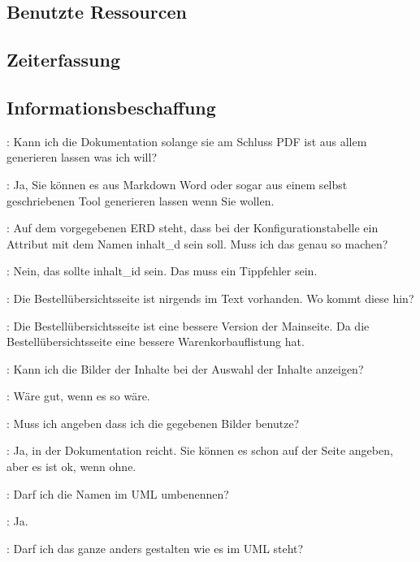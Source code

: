 \documentclass[a4paper, 11pt]{article}
\begin{document}
\subsection{Benutzte Ressourcen}

\subsection{Zeiterfassung}

\subsection{Informationsbeschaffung}

\begin{drama}

\msspeaks: Kann ich die Dokumentation solange sie am Schluss PDF ist aus allem generieren lassen was ich will?

\dozentspeaks: Ja, Sie können es aus Markdown Word oder sogar aus einem selbst geschriebenen Tool generieren lassen wenn Sie wollen.

\msspeaks: Auf dem vorgegebenen ERD steht, dass bei der Konfigurationstabelle ein Attribut mit dem Namen inhalt\_d sein soll. Muss ich das genau so machen?

\dozentspeaks: Nein, das sollte inhalt\_id sein. Das muss ein Tippfehler sein.

\msspeaks: Die Bestellübersichtsseite ist nirgends im Text vorhanden. Wo kommt diese hin?

\dozentspeaks: Die Bestellübersichtsseite ist eine bessere Version der Mainseite. Da die Bestellübersichtsseite eine bessere Warenkorbauflistung hat.

\msspeaks: Kann ich die Bilder der Inhalte bei der Auswahl der Inhalte anzeigen?

\dozentspeaks: Wäre gut, wenn es so wäre.

\msspeaks: Muss ich angeben dass ich die gegebenen Bilder benutze?

\dozentspeaks: Ja, in der Dokumentation reicht. Sie können es schon auf der Seite angeben, aber es ist ok, wenn ohne.

\msspeaks: Darf ich die Namen im UML umbenennen?

\dozentspeaks: Ja.

\msspeaks: Darf ich das ganze anders gestalten wie es im UML steht?


\end{drama}
\end{document}

